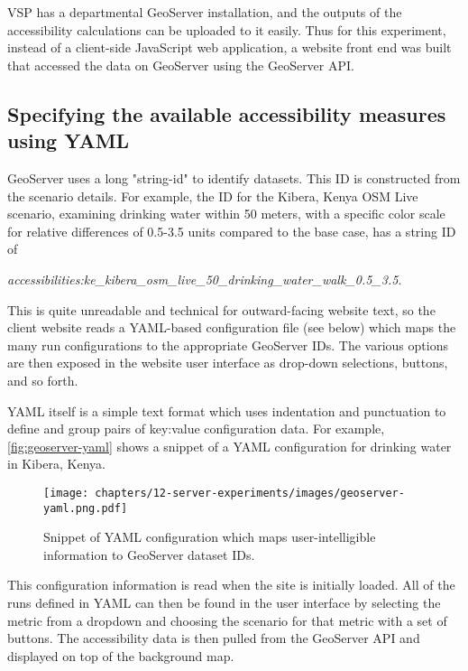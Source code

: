 VSP has a departmental GeoServer installation, and the outputs of the accessibility calculations can be uploaded to it easily. Thus for this experiment, instead of a client-side JavaScript web application, a website front end was built that accessed the data on GeoServer using the GeoServer API.

\hypertarget{server-experiments-geoserver-2}{%
\subsection{Specifying the available accessibility measures using YAML}
\label{server-experiments-geoserver-2}}

GeoServer uses a long "string-id" to identify datasets. This ID is constructed from the scenario details. For example, the ID for the Kibera, Kenya OSM Live scenario, examining drinking water within 50 meters, with a specific color scale for relative differences of 0.5-3.5 units compared to the base case, has a string ID of

\emph{accessibilities:ke\_kibera\_osm\_live\_50\_drinking\_water\_walk\_0.5\_3.5}.

This is quite unreadable and technical for outward-facing website text, so the client website reads a YAML-based configuration file (see below) which maps the many run configurations to the appropriate GeoServer IDs. The various options are then exposed in the website user interface as drop-down selections, buttons, and so forth.

YAML itself is a simple text format which uses indentation and punctuation to define and group pairs of key:value configuration data. For example, \autoref{fig:geoserver-yaml} shows a snippet of a YAML configuration for drinking water in Kibera, Kenya.

\begin{figure}[!ht]
  \texttt{[image: chapters/12-server-experiments/images/geoserver-yaml.png.pdf]}
  \caption[GeoServer YAML configuration example]{Snippet of YAML configuration which maps user-intelligible information to GeoServer dataset IDs.}
  \label{fig:geoserver-yaml}
\end{figure}

This configuration information is read when the site is initially loaded. All of the runs defined in YAML can then be found in the user interface by selecting the metric from a dropdown and choosing the scenario for that metric with a set of buttons. The accessibility data is then pulled from the GeoServer API and displayed on top of the background map.

